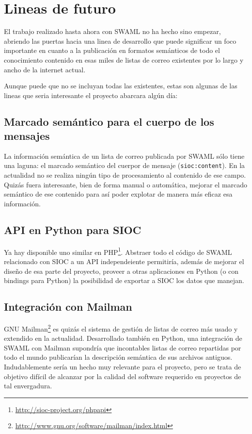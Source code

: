 
\section{Lineas de futuro}

El trabajo realizado hasta ahora con SWAML no ha hecho sino empezar, abriendo las 
puertas hacia una linea de desarrollo que puede significar un foco importante
en cuanto a la publicación en formatos semánticos de todo el conocimiento contenido
en esas miles de listas de correo existentes por lo largo y ancho de la internet
actual.

Aunque puede que no se incluyan todas las existentes, estas son algunas de las lineas
que seria interesante el proyecto abarcara algún día:

\subsection*{Marcado semántico para el cuerpo de los mensajes}

La información semántica de un lista de correo publicada por SWAML sólo tiene una
laguna: el marcado semántico del cuerpor de mensaje (\texttt{sioc:content}). En
la actualidad no se realiza ningún tipo de procesamiento al contenido de ese campo.
Quizás fuera interesante, bien de forma manual o automática, mejorar el marcado
semántico de ese contenido para así poder explotar de manera más eficaz esa 
información.

\subsection*{API en Python para SIOC}

Ya hay disponible uno similar en PHP\footnote{\url{http://sioc-project.org/phpapi}}. 
Abstraer todo el código de SWAML relacionado con SIOC a un API independeiente permitiría,
además de mejorar el diseño de esa parte del proyecto, proveer a otras aplicaciones 
en Python (o con bindings para Python) la posibilidad de exportar a SIOC los datos 
que manejan.

\subsection*{Integración con Mailman}

GNU Mailman\footnote{\url{http://www.gnu.org/software/mailman/index.html}} es quizás el
sistema de gestión de listas de correo más usado y extendido en la actualidad. Desarrollado
también en Python, una integración de SWAML con Mailman supondría que incontables listas
de correo repartidas por todo el mundo publicarían la descripción semántica de sus
archivos antiguos. Indudablemente sería un hecho muy relevante para el proyecto, pero
se trata de objetivo difícil de alcanzar por la calidad del software requerido en
proyectos de tal envergadura.

